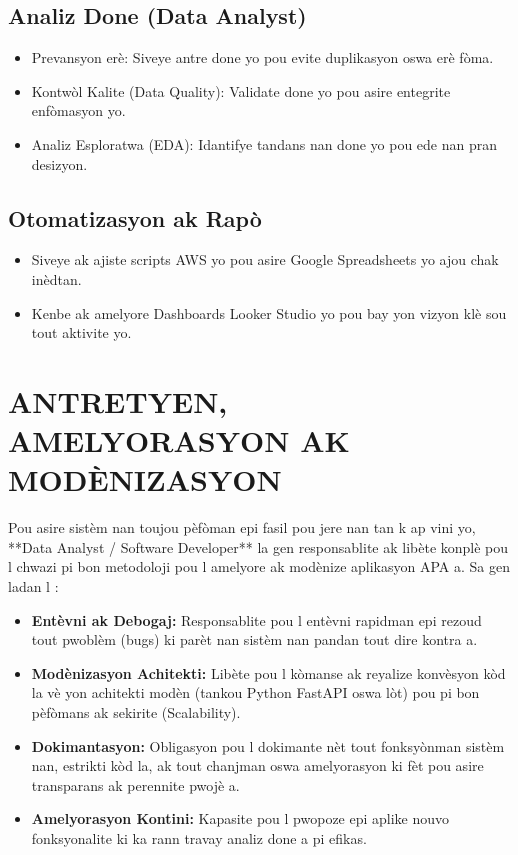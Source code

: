 \documentclass[12pt,a4paper]{article}
\begin{document}
\subsection{Analiz Done (Data Analyst)}
\begin{itemize}
    \item Prevansyon erè: Siveye antre done yo pou evite duplikasyon oswa erè fòma.
    \item Kontwòl Kalite (Data Quality): Validate done yo pou asire entegrite enfòmasyon yo.
    \item Analiz Esploratwa (EDA): Idantifye tandans nan done yo pou ede nan pran desizyon.
\end{itemize}

\subsection{Otomatizasyon ak Rapò}
\begin{itemize}
    \item Siveye ak ajiste scripts AWS yo pou asire Google Spreadsheets yo ajou chak inèdtan.
    \item Kenbe ak amelyore Dashboards Looker Studio yo pou bay yon vizyon klè sou tout aktivite yo.
\end{itemize}

\section{ANTRETYEN, AMELYORASYON AK MODÈNIZASYON}
Pou asire sistèm nan toujou pèfòman epi fasil pou jere nan tan k ap vini yo, **Data Analyst / Software Developer** la gen responsablite ak libète konplè pou l chwazi pi bon metodoloji pou l amelyore ak modènize aplikasyon APA a. Sa gen ladan l :

\begin{itemize}
    \item \textbf{Entèvni ak Debogaj:} Responsablite pou l entèvni rapidman epi rezoud tout pwoblèm (bugs) ki parèt nan sistèm nan pandan tout dire kontra a.
    \item \textbf{Modènizasyon Achitekti:} Libète pou l kòmanse ak reyalize konvèsyon kòd la vè yon achitekti modèn (tankou Python FastAPI oswa lòt) pou pi bon pèfòmans ak sekirite (Scalability).
    \item \textbf{Dokimantasyon:} Obligasyon pou l dokimante nèt tout fonksyònman sistèm nan, estrikti kòd la, ak tout chanjman oswa amelyorasyon ki fèt pou asire transparans ak perennite pwojè a.
    \item \textbf{Amelyorasyon Kontini:} Kapasite pou l pwopoze epi aplike nouvo fonksyonalite ki ka rann travay analiz done a pi efikas.
\end{itemize}
\end{document}
